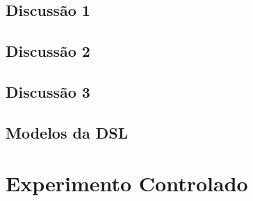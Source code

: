 \begin{apendicesenv}
\section{Discussão 1}
    \begin{figure}[!htb]
        \centering
        
    \end{figure}
\newpage
\section{Discussão 2}
    \begin{figure}
        \centering
         
    \end{figure}
\newpage
\section{Discussão 3}
    \begin{figure}
        \centering
         
    \end{figure}
\newpage
\section{Modelos da DSL}
    \begin{figure}
        \centering
         
    \end{figure}
\newpage

\chapter{Experimento Controlado} \label{EXPERIMENTOCONTROL}


\end{apendicesenv}
